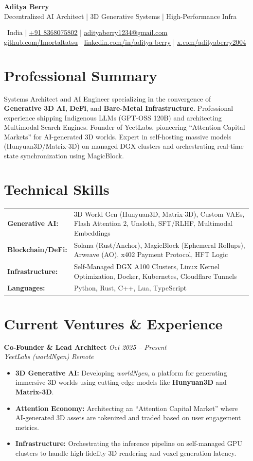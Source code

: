 \documentclass[a4paper,11pt]{article}
\makeatletter
\newcommand{\makeheading}{
    \begin{center}
        {\Huge\bfseries Aditya Berry} \\ \vspace{0.5em}
        {\Large Decentralized AI Architect | 3D Generative Systems | High-Performance Infra} \\ \vspace{0.8em}
        
        \color{secondary}
        \small
        \faMapMarker \ India \quad | \quad
        \faPhone \href{tel:+918368075802}{+91 8368075802} \quad | \quad
        \faEnvelope \href{mailto:adityaberry1234@gmail.com}{adityaberry1234@gmail.com} \\ \vspace{0.4em}
        \faGithub \href{https://github.com/Imortaltatsu}{github.com/Imortaltatsu} \quad | \quad
        \faLinkedin \href{https://www.linkedin.com/in/aditya-berry-a70190178/}{linkedin.com/in/aditya-berry} \quad | \quad
        \faTwitter \href{https://x.com/adityaberry2004}{x.com/adityaberry2004}
    \end{center}
    \vspace{0.5em}
}
\newcommand{\entry}[4]{
    \par\vspace{0.4em}\noindent
    {\textbf{\large #1}} \hfill {\textit{\color{secondary} #2}} \\
    {\textit{\color{secondary} #3}} \hfill {\textit{\small #4}} \par
    \vspace{0.1em}
}
\newenvironment{tightlist}{
    \begin{itemize}
    \setlength{\itemsep}{1pt}
    \setlength{\parskip}{0pt}
    \setlength{\parsep}{0pt}
}{
    \end{itemize}
}
\makeatother
\begin{document}
\makeheading

\section*{Professional Summary}
Systems Architect and AI Engineer specializing in the convergence of \textbf{Generative 3D AI}, \textbf{DeFi}, and \textbf{Bare-Metal Infrastructure}. Professional experience shipping Indigenous LLMs (GPT-OSS 120B) and architecting Multimodal Search Engines. Founder of YeetLabs, pioneering ``Attention Capital Markets'' for AI-generated 3D worlds. Expert in self-hosting massive models (Hunyuan3D/Matrix-3D) on managed DGX clusters and orchestrating real-time state synchronization using MagicBlock.

\section*{Technical Skills}
\noindent
\begin{tabular*}{\textwidth}{@{}p{}p{}@{}}
    \textbf{Generative AI:} & 3D World Gen (Hunyuan3D, Matrix-3D), Custom VAEs, Flash Attention 2, Unsloth, SFT/RLHF, Multimodal Embeddings \\
    \textbf{Blockchain/DeFi:} & Solana (Rust/Anchor), MagicBlock (Ephemeral Rollups), Arweave (AO), x402 Payment Protocol, HFT Logic \\
    \textbf{Infrastructure:} & Self-Managed DGX A100 Clusters, Linux Kernel Optimization, Docker, Kubernetes, Cloudflare Tunnels \\
    \textbf{Languages:} & Python, Rust, C++, Lua, TypeScript \\
\end{tabular*}

\section*{Current Ventures \& Experience}

\entry{Co-Founder \& Lead Architect}{Oct 2025 – Present}{YeetLabs (worldNgen)}{Remote}
\begin{tightlist}
    \item \textbf{3D Generative AI:} Developing \textit{worldNgen}, a platform for generating immersive 3D worlds using cutting-edge models like \textbf{Hunyuan3D} and \textbf{Matrix-3D}.
    \item \textbf{Attention Economy:} Architecting an ``Attention Capital Market'' where AI-generated 3D assets are tokenized and traded based on user engagement metrics.
    \item \textbf{Infrastructure:} Orchestrating the inference pipeline on self-managed GPU clusters to handle high-fidelity 3D rendering and voxel generation latency.
\end{tightlist}
\end{document}
